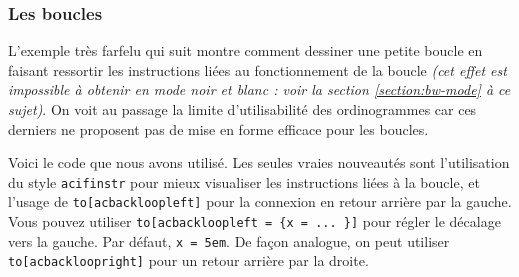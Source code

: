 \documentclass[12pt,a4paper]{article}
\begin{document}


\subsubsection{Les boucles}

L'exemple très farfelu qui suit montre comment dessiner une petite boucle en faisant ressortir les instructions liées au fonctionnement de la boucle \emph{(cet effet est impossible à obtenir en mode noir et blanc : voir la section \ref{section:bw-mode} à ce sujet)}.
On voit au passage la limite d'utilisabilité des ordinogrammes car ces derniers ne proposent pas de mise en forme efficace pour les boucles.


\begin{center}
    \small
    
\end{center}


Voici le code que nous avons utilisé. Les seules vraies nouveautés sont l'utilisation du style \verb+acifinstr+ pour mieux visualiser les instructions liées à la boucle, et l'usage de \verb+to[acbackloopleft]+ pour la connexion en retour arrière par la gauche.
Vous pouvez utiliser \verb+to[acbackloopleft = {x = ... }]+  pour régler le décalage vers la gauche.
Par défaut, \verb+x = 5em+.
De façon analogue, on peut utiliser \verb+to[acbackloopright]+ pour un retour arrière par la droite. 

\medskip

\end{document}
